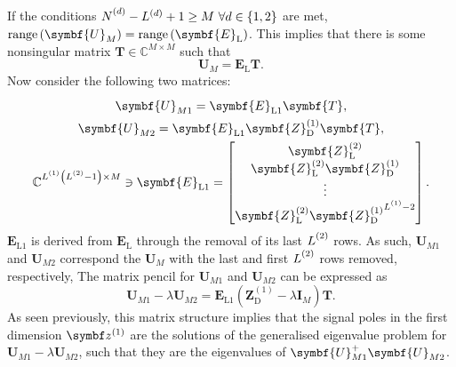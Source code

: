 If the conditions $\Nd - L^{(d)} + 1 \geq M\ \forall d \in \lbrace 1, 2
\rbrace$ are met, $\range\left(\symbf{U}_M\right) =
\range\left(\symbf{E}_{\text{L}}\right)$. This implies that there is some
nonsingular matrix $\symbf{T} \in \mathbb{C}^{M \times M}$ such that
\begin{equation}
    \symbf{U}_M = \symbf{E}_{\text{L}} \symbf{T}.
\end{equation}
Now consider the following two matrices:
\begin{subequations}
    \begin{gather}
        \symbf{U}_{M1} = \symbf{E}^{\vphantom{(1)}}_{\text{L}1} \symbf{T},\\
        \symbf{U}_{M2} = \symbf{E}^{\vphantom{(1)}}_{\text{L}1} \symbf{Z}^{(1)}_{\text{D}} \symbf{T},\\
        \mathbb{C}^{\Lone \left(\Ltwo - 1\right) \times M} \ni
        \symbf{E}_{\text{L}1} =
        \begin{bmatrix}
            \symbf{Z}^{(2)}_{\text{L}} \\
            \symbf{Z}^{(2)}_{\text{L}} \symbf{Z}^{(1)}_{\text{D}} \\
            \vdots \\
            \symbf{Z}^{(2)}_{\text{L}} {\symbf{Z}^{(1)}_{\text{D}}}^{\Lone - 2}
        \end{bmatrix}.
    \end{gather}
\end{subequations}
$\symbf{E}_{\text{L}1}$ is derived from $\symbf{E}_{\text{L}}$ through the
removal of its last $\Ltwo$ rows.
As such, $\symbf{U}_{M1}$ and $\symbf{U}_{M2}$ correspond the $\symbf{U}_M$
with the last and first $\Ltwo$ rows removed, respectively,  The matrix pencil
for $\symbf{U}_{M1}$ and $\symbf{U}_{M2}$ can be expressed as
\begin{equation}
    \symbf{U}_{M1} - \lambda \symbf{U}_{M2} =
    \symbf{E}_{\text{L}1} \left( \symbf{Z}^{(1)}_{\text{D}} - \lambda \symbf{I}_M \right) \symbf{T}.
\end{equation}
As seen previously, this matrix structure implies that the signal poles in the
first dimension $\bdzone$ are the solutions of the generalised eigenvalue
problem for $\symbf{U}_{M1} - \lambda \symbf{U}_{M2}$, such that they are
the eigenvalues of $\symbf{U}_{M1}^{+} \symbf{U}_{M2}^{\vphantom{+}}$.

